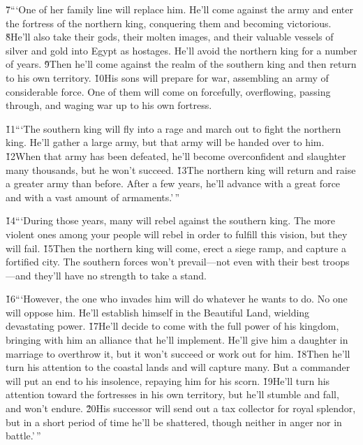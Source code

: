 \v{7}```One of her family line will replace him. He'll come against the army and enter the fortress of the northern king, conquering them and becoming victorious. \v{8}He'll also take their gods, their molten images, and their valuable vessels of silver and gold into Egypt as hostages. He'll avoid the northern king for a number of years. \v{9}Then he'll come against the realm of the southern king and then return to his own territory. \v{10}His sons will prepare for war, assembling an army of considerable force. One of them will come on forcefully, overflowing, passing through, and waging war up to his own fortress.

\v{11}```The southern king will fly into a rage and march out to fight the northern king. He'll gather a large army, but that army will be handed over to him. \v{12}When that army has been defeated, he'll become overconfident and slaughter many thousands, but he won't succeed. \v{13}The northern king will return and raise a greater army than before. After a few years, he'll advance with a great force and with a vast amount of armaments.'\,''

\v{14}```During those years, many will rebel against the southern king. The more violent ones among your people will rebel in order to fulfill this vision, but they will fail. \v{15}Then the northern king will come, erect a siege ramp, and capture a fortified city. The southern forces won't prevail---not even with their best troops---and they'll have no strength to take a stand.

\v{16}```However, the one who invades him will do whatever he wants to do. No one will oppose him. He'll establish himself in the Beautiful Land, wielding devastating power. \v{17}He'll decide to come with the full power of his kingdom, bringing with him an alliance that he'll implement. He'll give him a daughter in marriage to overthrow it, but it won't succeed or work out for him. \v{18}Then he'll turn his attention to the coastal lands and will capture many. But a commander will put an end to his insolence, repaying him for his scorn. \v{19}He'll turn his attention toward the fortresses in his own territory, but he'll stumble and fall, and won't endure. \v{20}His successor will send out a tax collector for royal splendor, but in a short period of time he'll be shattered, though neither in anger nor in battle.'\,''

